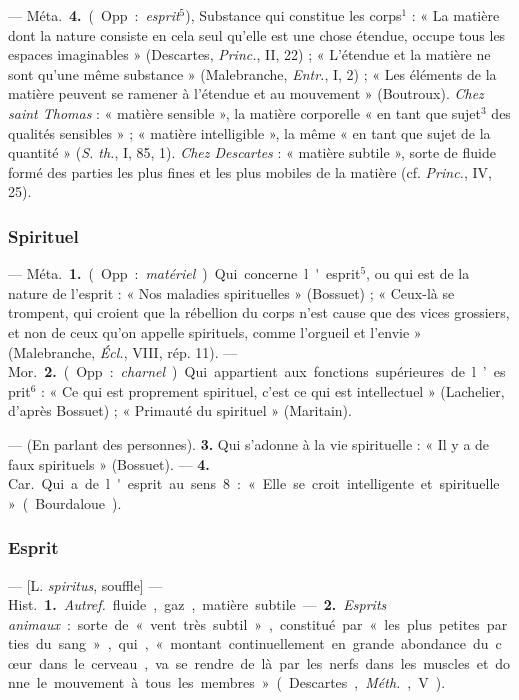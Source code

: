 — \si{Méta.} {\bf 4.} (Opp. : {\it esprit}$^5$), Substance qui constitue les
corps$^1$ : « La matière dont la nature consiste en cela seul qu’elle est une
chose étendue, occupe tous les espaces imaginables » (Descartes,
{\it Princ.}, II, 22) ; « L’étendue et la matière ne sont qu'une même
substance » (Malebranche, {\it Entr.}, I, 2) ; « Les éléments de la matière
peuvent se ramener à l'étendue et au mouvement » (Boutroux). {\it Chez saint
Thomas} : « matière sensible », la matière corporelle « en tant que sujet$^3$
des qualités sensibles » ; « matière intelligible », la même « en tant que
sujet de la quantité » ({\it S. th.}, I, 85, 1). {\it Chez Descartes} :
« matière subtile », sorte de fluide formé des parties les plus fines et les
plus mobiles de la matière (cf. {\it Princ.}, IV, 25).

\subsubsection{Spirituel}
 — \si{Méta.} {\bf 1.} (Opp. : {\it matériel}). Qui concerne
l'esprit$^5$, ou qui est de la nature de l'esprit : « Nos maladies
spirituelles » (Bossuet) ; « Ceux-là se trompent, qui croient que la
rébellion du corps n'est cause que des vices grossiers, et non de ceux
qu’on appelle spirituels, comme l’orgueil et l’envie » (Malebranche,
{\it Écl.}, VIII, rép. 11). — \si{Mor.} {\bf 2.} (Opp. : {\it charnel}). Qui
appartient aux fonctions supérieures de l’esprit$^6$ : « Ce qui est
proprement spirituel, c’est ce qui est intellectuel » (Lachelier, d’après
Bossuet) ; « Primauté du spirituel » (Maritain).

— (En parlant des personnes).  {\bf 3.} Qui s’adonne à la vie spirituelle : «
Il y a de faux spirituels » (Bossuet). — {\bf 4.} \si{Car.} Qui a de l'esprit
au sens 8: « Elle se croit intelligente et spirituelle » (Bourdaloue).

\subsubsection{Esprit}
 — [L. {\it spiritus}, souffle] — \si{Hist.}
{\bf 1.} {\it Autref.} fluide, gaz, matière
subtile. — {\bf 2.} {\it Esprits animaux} : sorte
de « vent très subtil », constitué
par « les plus petites parties du
sang », qui, « montant continuellement en grande abondance du
cœur dans le cerveau, va se rendre
de là par les nerfs dans les muscles
et donne le mouvement à tous les
membres » (Descartes, {\it Méth.}, V).

